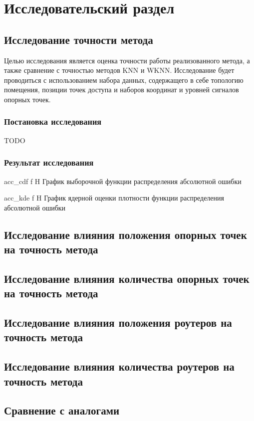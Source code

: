 \chapter{Исследовательский раздел}

\section{Исследование точности метода}

Целью исследования является оценка точности работы реализованного метода, а также сравнение с точностью методов KNN и WKNN. Исследование будет проводиться с использованием набора данных, содержащего в себе топологию помещения, позиции точек доступа и наборов координат и уровней сигналов опорных точек. 

\subsection{Постановка исследования}

TODO

\subsection{Результат исследования}

    {acc_cdf}
    {f}
    {H}
    {\linewidth}
    {График выборочной функции распределения абсолютной ошибки}

    {acc_kde}
    {f}
    {H}
    {\linewidth}
    {График ядерной оценки плотности функции распределения абсолютной ошибки}

\section{Исследование влияния положения опорных точек на точность метода}

\section{Исследование влияния количества опорных точек на точность метода}

\section{Исследование влияния положения роутеров на точность метода}

\section{Исследование влияния количества роутеров на точность метода}

\section{Сравнение с аналогами}
